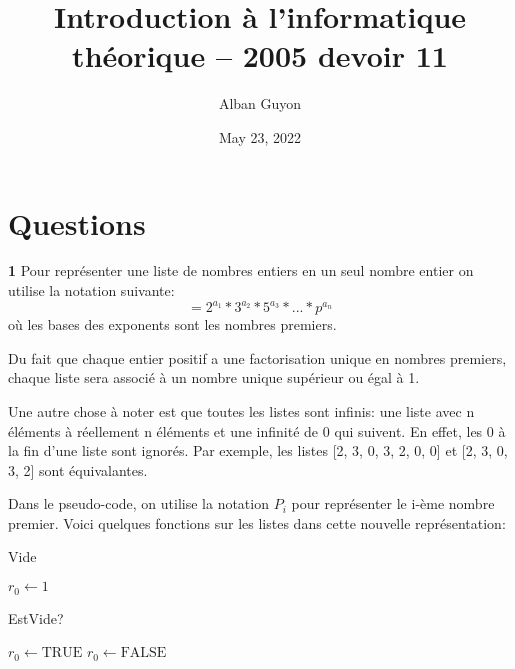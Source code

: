 \documentclass{article}
\title{Introduction à l'informatique théorique -- 2005 devoir 11}
\author{Alban Guyon}
\date{May 23, 2022}
\begin{document}
    \maketitle
    
    \section{Questions}
    
    \textbf{1}
    Pour représenter une liste de nombres entiers en un seul nombre entier on utilise la notation suivante:
    \begin{equation}
    [a_1, a_2, a_3, ..., a_n, 0, 0, 0, ...] = 2^{a_1} * 3^{a_2} * 5^{a_3} * ... * p^{a_n}
    \end{equation}
    où les bases des exponents sont les nombres premiers.

    Du fait que chaque entier positif a une factorisation unique en nombres premiers, chaque liste
    sera associé à un nombre unique supérieur ou égal à 1.

    Une autre chose à noter est que toutes les listes sont infinis: une liste avec n éléments à réellement n
    éléments et une infinité de 0 qui suivent. En effet, les 0 à la fin d'une liste sont ignorés. 
    Par exemple, les listes [2, 3, 0, 3, 2, 0, 0] et [2, 3, 0, 3, 2] sont équivalantes.

    Dans le pseudo-code, on utilise la notation $P_i$ pour représenter le i-ème nombre premier.	
    Voici quelques fonctions sur les listes dans cette nouvelle représentation:

    \begin{algorithm}[H]
        \caption{Vide}\label{Vide}
        \begin{algorithmic}
        \State $\textit{$r_0$} \gets \text{1}$
        \EndProcedure
        \end{algorithmic}
    \end{algorithm}

    \begin{algorithm}[H]
        \caption{EstVide?}\label{EstVide?}
        \begin{algorithmic}
            \State $\textit{$r_0$} \gets \text{TRUE}$
        \Else {}
            \State $\textit{$r_0$} \gets \text{FALSE}$
        \EndIf
        \EndProcedure
        \end{algorithmic}
    \end{algorithm}
\end{document}

